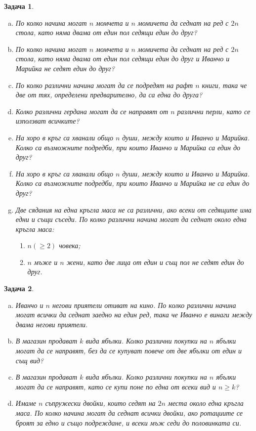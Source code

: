 \documentclass[a4paper]{article}
\newtheorem{problem}{Задача}
\begin{document}
\begin{problem}
  \begin{enumerate}[a)]
  \item
    По колко начина могат $n$ момчета и $n$ момичета да седнат на ред с $2n$ стола, като няма двама от един пол седящи един до друг?
  \item
    По колко начина могат $n$ момчета и $n$ момичета да седнат на ред с $2n$ стола, като няма двама от един пол седящи един до друг и Иванчо и Марийка не седят един до друг? 
  \item
    По колко различни начина могат да се подредят на рафт $n$ книги, така че две от тях, определени предварително, да са една до друга?
  \item
    Колко различни гердана могат да се направят от $n$ различни перли, като се използват всичките?
  \item
    На хоро в кръг са хванали общо $n$ души, между които и Иванчо и Марийка.
    Колко са възможните подредби, при които Иванчо и Марийка са един до друг?
 \item
    На хоро в кръг са хванали общо $n$ души, между които и Иванчо и Марийка.
    Колко са възможните подредби, при които Иванчо и Марийка не са един до друг?
  \item
    Две сядания на една кръгла маса не са различни, ако всеки от седящите има едни и същи съседи.
    По колко различни начина могат да седнат около една кръгла маса:
    \begin{enumerate}
    \item
      $n (\geq 2)$ човека;
    \item
      $n$ мъже и $n$ жени, като две лица от един и същ пол не седят един до друг.
    \end{enumerate}
  \end{enumerate}
\end{problem}


\begin{problem}
  \begin{enumerate}[a)]
  \item
    Иванчо и $n$ негови приятели отиват на кино.
    По колко различни начина могат всички да седнат заедно на един ред, така че Иванчо е винаги
    между двама негови приятели.
  \item
    В магазин продават $k$ вида ябълки.
    Колко различни покупки на $n$ ябълки могат да се направят, без да се купуват повече от две ябълки от един и същ вид?
  \item
    В магазин продават $k$ вида ябълки.
    Колко различни покупки на $n$ ябълки могат да се направят, като се купи поне по една от всеки вид и $n\geq k$?
  \item
    Имаме $n$ съпружески двойки, които седят на $2n$ места около една кръгла маса. 
    По колко начина могат да седнат всички двойки, ако ротациите се броят за едно и също подреждане, и
    всеки мъж седи до половинката си.
\end{enumerate}
\end{problem}
\end{document}
